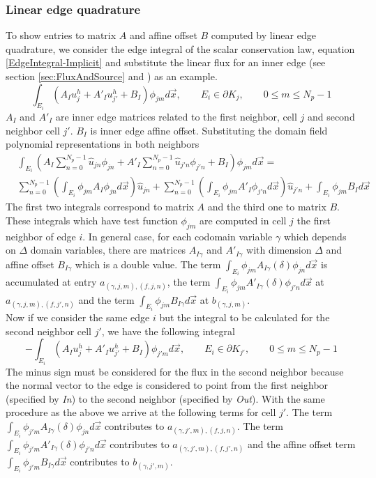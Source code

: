 \documentclass[BoSSSForSolvingConservationLaws.tex]{subfiles}
\begin{document}
\subsubsection{Linear edge quadrature}
\label{sec:LinearEdgeQuadrature}
To show entries to matrix $A$ and affine offset $B$ computed by linear edge quadrature, we consider the edge integral of the scalar conservation law, equation \eqref{EdgeIntegral-Implicit} and substitute the linear flux for an inner edge (see section \ref{sec:FluxAndSource} and ) as an example.
\[
\int_{E_i} (A_I u_j^h+A'_I u_{j'}^h+B_I) \phi_{jm} d\vec{x}, \qquad E_i \in \partial K_j,\qquad 0\leq m \leq N_p-1
\]
$A_I$ and $A'_I$ are inner edge matrices related to the first neighbor, cell $j$ and second neighbor cell $j'$. $B_I$ is inner edge affine offset. Substituting the domain field polynomial representations in both neighbors
\begin{align*}
&\int_{E_i} (A_I \sum_{n=0}^{N_p-1} \hat u_{jn} \phi_{jn}+A'_I \sum_{n=0}^{N_p-1} \hat u_{j'n} \phi_{j'n}+B_I) \phi_{jm} d\vec{x}=\\
&\sum_{n=0}^{N_p-1} (\int_{E_i} \phi_{jm} A_I  \phi_{jn} d\vec{x}) \hat u_{jn}+
\sum_{n=0}^{N_p-1} (\int_{E_i} \phi_{jm} A'_I  \phi_{j'n} d\vec{x}) \hat u_{j'n}+
\int_{E_i} \phi_{jm} B_I d\vec{x}
\end{align*}
The first two integrals correspond to matrix $A$ and the third one to matrix $B$. These integrals which have test function $\phi_{jm}$ are computed in cell $j$ the first neighbor of edge $i$. In general case, for each codomain variable $\gamma$ which depends on $\Delta$ domain variables, there are matrices $A_{I\gamma}$ and $A'_{I\gamma}$ with dimension $\Delta$ and affine offset $B_{I\gamma}$ which is a double value. The term $\int_{E_i} \phi_{jm} A_{I\gamma}(\delta) \phi_{jn} d\vec{x}$ is accumulated at entry $a_{(\gamma,j,m),(f,j,n)}$, the term $\int_{E_i} \phi_{jm} A'_{I\gamma}(\delta) \phi_{j'n} d\vec{x}$ at $a_{(\gamma,j,m),(f,j',n)}$ and the term $\int_{E_i} \phi_{jm} B_{I\gamma} d\vec{x}$ at $b_{(\gamma,j,m)}$.\\
Now if we consider the same edge $i$ but the integral to be calculated for the second neighbor cell $j'$, we have the following integral
\[
-\int_{E_i} (A_I u_j^h+A'_I u_{j'}^h+B_I) \phi_{j'm} d\vec{x}, \qquad E_i \in \partial K_{j'},\qquad 0\leq m \leq N_p-1
\]
The minus sign must be considered for the flux in the second neighbor because the normal vector to the edge is considered to point from the first neighbor (specified by \emph{In}) to the second neighbor (specified by \emph{Out}). With the same procedure as the above we arrive at the following terms for cell $j'$. The term $\int_{E_i} \phi_{j'm} A_{I\gamma}(\delta) \phi_{jn} d\vec{x}$ contributes to $a_{(\gamma,j',m),(f,j,n)}$. The term $\int_{E_i} \phi_{j'm} A'_{I\gamma}(\delta) \phi_{j'n} d\vec{x}$ contributes to $a_{(\gamma,j',m),(f,j',n)}$ and the affine offset term $\int_{E_i} \phi_{j'm} B_{I\gamma} d\vec{x}$ contributes to $b_{(\gamma,j',m)}$.\\
\end{document}
